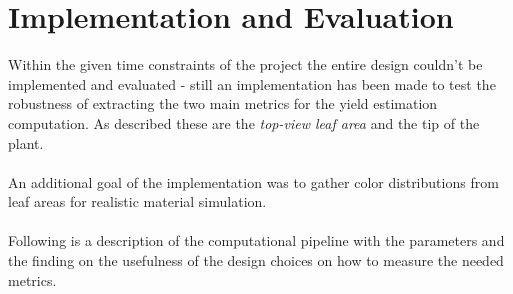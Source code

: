 \section{Implementation and Evaluation}\label{sec:implementation-and-evaluation}

Within the given time constraints of the project the entire design couldn't be implemented and evaluated - still an implementation
has been made to test the robustness of extracting the two main metrics for the yield estimation computation.
As described these are the \textit{top-view leaf area} and the tip of the plant.
\\
\\
An additional goal of the implementation was to gather color distributions from leaf areas for realistic material simulation.
\\
\\
Following is a description of the computational pipeline with the parameters and the finding on the usefulness of the design choices
on how to measure the needed metrics.